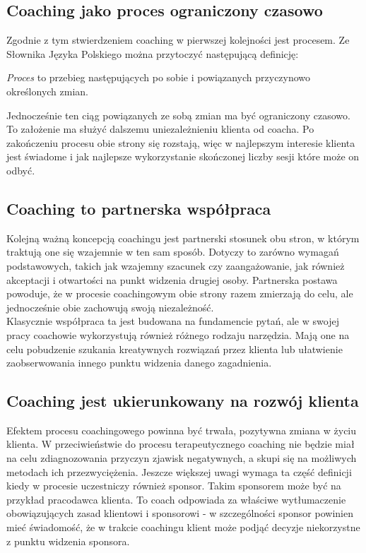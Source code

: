 \subsection{Coaching jako proces ograniczony czasowo}
Zgodnie z tym stwierdzeniem coaching w pierwszej kolejności jest procesem. Ze Słownika Języka Polskiego można przytoczyć następującą definicję:
\begin{defn}
\emph{Proces} to przebieg następujących po sobie i powiązanych przyczynowo określonych zmian.
\end{defn}
Jednocześnie ten ciąg powiązanych ze sobą zmian ma być ograniczony czasowo. To założenie ma służyć dalszemu uniezależnieniu klienta
od coacha. Po zakończeniu procesu obie strony się rozstają, więc w najlepszym interesie klienta jest świadome i jak najlepsze wykorzystanie
skończonej liczby sesji które może on odbyć.

\subsection{Coaching to partnerska współpraca}
Kolejną ważną koncepcją coachingu jest partnerski stosunek obu stron, w którym traktują one się wzajemnie w ten sam sposób. Dotyczy to zarówno
wymagań podstawowych, takich jak wzajemny szacunek czy zaangażowanie, jak również akceptacji i otwartości na punkt widzenia drugiej
osoby. Partnerska postawa powoduje, że w procesie coachingowym obie strony razem zmierzają do celu, ale jednocześnie obie zachowują
swoją niezależność. \\

Klasycznie współpraca ta jest budowana na fundamencie pytań, ale w swojej pracy coachowie wykorzystują również różnego rodzaju
narzędzia. Mają one na celu pobudzenie szukania kreatywnych rozwiązań przez klienta lub ułatwienie zaobserwowania
innego punktu widzenia danego zagadnienia.

\subsection{Coaching jest ukierunkowany na rozwój klienta}
Efektem procesu coachingowego powinna być trwała, pozytywna zmiana w życiu klienta. W przeciwieństwie do procesu terapeutycznego coaching
nie będzie miał na celu zdiagnozowania przyczyn zjawisk negatywnych, a skupi się na możliwych metodach ich przezwyciężenia. Jeszcze większej
uwagi wymaga ta część definicji kiedy w procesie uczestniczy również sponsor. Takim sponsorem może być na przykład pracodawca klienta.
To coach odpowiada za właściwe wytłumaczenie obowiązujących zasad klientowi i sponsorowi - w szczególności sponsor powinien mieć świadomość,
że w trakcie coachingu klient może podjąć decyzje niekorzystne z punktu widzenia sponsora.

